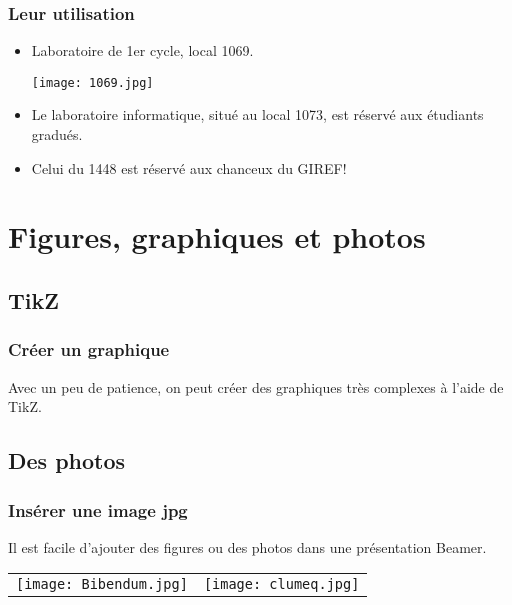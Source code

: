 \documentclass{beamer}
\begin{document}
\begin{frame}
\frametitle{Leur utilisation}
\begin{itemize}
\item Laboratoire de 1er cycle, local 1069.
\begin{center}
\texttt{[image: 1069.jpg]}
\end{center}
\item Le laboratoire informatique, situé au local 1073, est réservé
      aux étudiants gradués.
\item Celui du 1448 est réservé aux chanceux du GIREF!
\end{itemize}
\end{frame}

\section{Figures, graphiques et photos}

\subsection{TikZ}
\begin{frame}
\frametitle{Créer un graphique}
Avec un peu de patience, on peut créer des graphiques très complexes à l'aide de TikZ.
\begin{center}
\end{center}
\end{frame}

\subsection{Des photos}
\begin{frame}
\frametitle{Insérer une image jpg}
Il est facile d'ajouter des figures ou des photos dans une présentation Beamer.
\begin{center}
\begin{tabular}{cc}
\texttt{[image: Bibendum.jpg]} &
\texttt{[image: clumeq.jpg]} \\
\end{tabular}
\end{center}
\end{frame}
\end{document}
